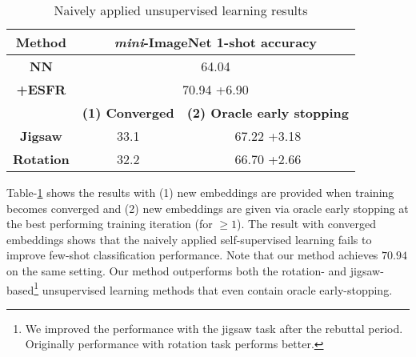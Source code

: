 \documentclass{article}
\begin{document}
\begin{table}[h]
	\caption{Naively applied unsupervised learning results}
	\label{table:results}
	\begin{small}
		\begin{center}
			\begin{tabular}{ccc}
				\textbf{Method} & \multicolumn{2}{c}{\textbf{\textit{mini}-ImageNet 1-shot accuracy}} \\ \hline
				\textbf{NN} & \multicolumn{2}{c}{64.04} \\
				\textbf{+ESFR} & \multicolumn{2}{c}{70.94 {\scriptsize+6.90}} \\ \hline
				& \textbf{(1) Converged} & \textbf{(2) Oracle early stopping} \\ \hline
				\textbf{Jigsaw} & 33.1 & 67.22 {\scriptsize+3.18} \\
				\textbf{Rotation} & 32.2 & 66.70 {\scriptsize+2.66} \\ \hline
			\end{tabular}
		\end{center}
	\end{small}
\end{table}
Table-\ref{table:results} shows the results with (1) new embeddings are provided when training becomes converged and (2) new embeddings are given via oracle early stopping at the best performing training iteration (for $\geq1$).
The result with converged embeddings shows that the naively applied self-supervised learning fails to improve few-shot classification performance.
Note that our method achieves $70.94$ on the same setting.
Our method outperforms both the rotation- and jigsaw-based\footnote{We improved the performance with the jigsaw task after the rebuttal period. Originally performance with rotation task performs better.} unsupervised learning methods that even contain oracle early-stopping.
\end{document}
